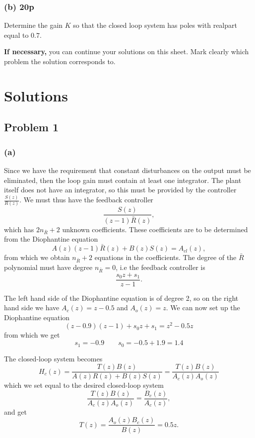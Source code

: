 \documentclass[letter,12pt]{article}
\newcommand{\bmpl}{\begin{minipage}[t]{\textwidth}}
\newcommand{\emp}{\end{minipage}}
\begin{document}
\clearpage
\subsubsection*{(b) 20p}

Determine the gain $K$ so that the closed loop system has poles with realpart equal to $0.7$.


\noindent
\fbox{
\bmpl
{\bf Solution:}\\
\vspace*{150mm}
\emp}

\cleardoublepage

\noindent
{\bf If necessary,} you can continue your solutions on this sheet. Mark clearly which problem the solution corresponds to.


\section*{Solutions}
\subsection*{Problem 1}

\subsubsection*{(a)}
Since we have the requirement that constant disturbances on the output must be eliminated, then the loop gain must contain at least one integrator. The plant itself does not have an integrator, so this must be provided by the controller \(\frac{S(z)}{R(z)}\). We must thus have the feedback controller
\[\frac{S(z)}{(z-1)\bar{R}(z)},\] which has \(2n_{\bar{R}} + 2\) unknown coefficients. These coefficients are to be determined from the Diophantine equation
\[ A(z)(z-1)\bar{R}(z) + B(z)S(z) = A_{cl}(z), \] from which we obtain \(n_{\bar{R}} + 2\) equations in the coefficients. The degree of the \(\bar{R}\) polynomial must have degree \(n_{\bar{R}} = 0\), i.e the feedback controller is 
\[ \frac{s_0z + s_1}{z-1}. \]

The left hand side of the Diophantine equation is of degree 2, so on the right hand side we have \(A_c(z) = z-0.5\) and \(A_o(z) = z\). We can now set up the Diophantine equation
\[ (z-0.9)(z-1) + s_0z + s_1 = z^2 - 0.5z \]
from which we get
\[ s_1 = -0.9 \qquad s_0 = -0.5+1.9 = 1.4\]

The closed-loop system becomes
\[ H_c(z) = \frac{T(z)B(z)}{A(z)R(z) + B(z)S(z)} =   \frac{T(z)B(z)}{A_c(z)A_o(z)} \]
which we set equal to the desired closed-loop system
\[  \frac{T(z)B(z)}{A_c(z)A_o(z)}  = \frac{B_c(z)}{A_c(z)},\] and get
\[ T(z) = \frac{A_o(z)B_c(z)}{B(z)} = 0.5z. \]
\end{document}
